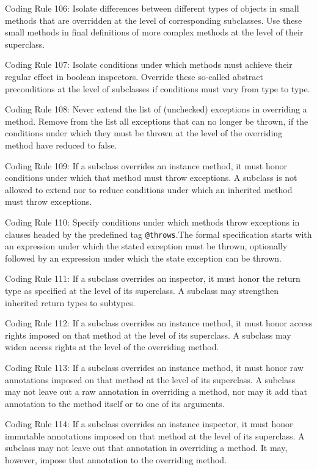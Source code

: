 \documentclass{article}
\begin{document}
\par Coding Rule 106: Isolate differences between different types of objects in small methods that are overridden at the level of corresponding subclasses. Use these small methods in final definitions of more complex methods at the level of their superclass.
\par Coding Rule 107: Isolate conditions under which methods must achieve their regular effect in boolean inspectors. Override these so-called abstract preconditions at the level of subclasses if conditions must vary from type to type.
\par Coding Rule 108: Never extend the list of (unchecked) exceptions in overriding a method. Remove from the list all exceptions that can no longer be thrown, if the conditions under which they must be thrown at the level of the overriding method have reduced to false.
\par Coding Rule 109: If a subclass overrides an instance method, it must honor conditions under which that method must throw exceptions. A subclass is not allowed to extend nor to reduce conditions under which an inherited method must throw exceptions.
\par Coding Rule 110: Specify conditions under which methods throw exceptions in clauses headed by the predefined tag \texttt{@throws}.The formal specification starts with an expression under which the stated exception must be thrown, optionally followed by an expression under which the state exception can be thrown.
\par Coding Rule 111: If a subclass overrides an inspector, it must honor the return type as specified at the level of its superclass. A subclass may strengthen inherited return types to subtypes. 
\par Coding Rule 112: If a subclass overrides an instance method, it must honor access rights imposed on that method at the level of its superclass. A subclass may widen access rights at the level of the overriding method.
\par Coding Rule 113: If a subclass overrides an instance method, it must honor raw  annotations imposed on that method at the level of its superclass. A subclass may not leave out a raw annotation in overriding a method, nor may it add that annotation to  the method itself or to one of its arguments.
\par Coding Rule 114: If a subclass overrides an instance inspector, it must honor immutable annotations imposed on that method at the level of its superclass. A subclass may not leave out that annotation in overriding a method. It may, however, impose that annotation to the overriding method.
\end{document}
